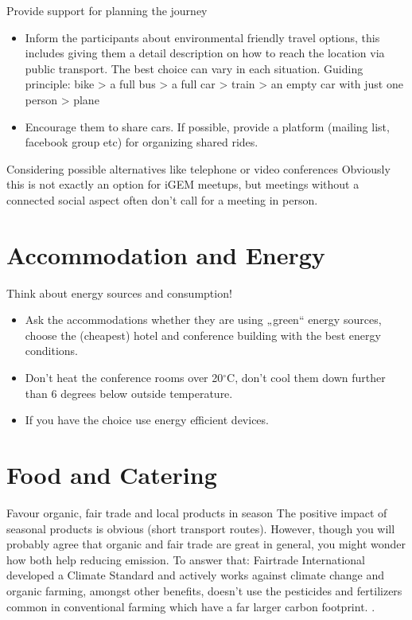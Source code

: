 \begin{suggest}{Provide support for planning the journey}
	\vspace{-2\topsep}
	\begin{itemize}
		\item Inform the participants about environmental friendly travel options, this includes giving them a detail description on how to reach the location via public transport. The best choice can vary in each situation. Guiding principle: bike > a full bus > a full car > train > an empty car with just one person > plane
		\item Encourage them to share cars. If possible, provide a platform (mailing list, facebook group etc) for organizing shared rides.
	\end{itemize}	
\end{suggest}

\begin{suggest}{Considering possible alternatives like telephone or video conferences}
	Obviously this is not exactly an option for iGEM meetups, but meetings without a connected social aspect often don't call for a meeting in person.
\end{suggest}

\section{Accommodation and Energy}

\begin{suggest}{Think about energy sources and consumption!}
	\vspace{-2\topsep}
	\begin{itemize}
		\item Ask the accommodations whether they are using „green“ energy sources, choose the (cheapest) hotel and conference building with the best energy conditions.
		\item Don't heat the conference rooms over 20$^\circ$C, don't cool them down further than 6 degrees below outside temperature.
		\item If you have the choice use energy efficient devices.
	\end{itemize}	
\end{suggest}

\section{Food and Catering}

\begin{suggest}{Favour organic, fair trade and local products in season}
	The positive impact of seasonal products is obvious (short transport routes). However, though you will probably agree that organic and fair trade are great in general, you might wonder how both help reducing emission. To answer that: Fairtrade International developed a Climate Standard and actively works against climate change \cite{fairtrade} and organic farming, amongst other benefits, doesn't use the pesticides and fertilizers common in conventional farming which have a far larger carbon footprint. \cite{organic}.
\end{suggest}

